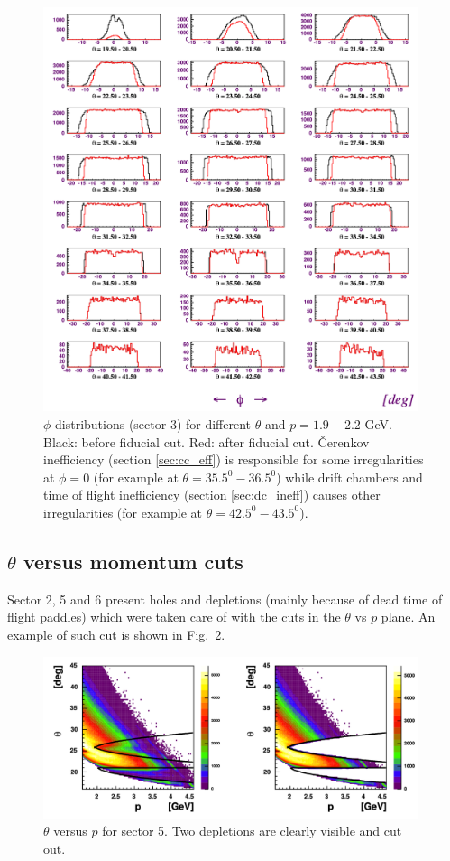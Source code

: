\begin{figure}[ht]
    \centering
    \includegraphics[width=0.98\textwidth ]{img/electron_phis}
    \caption{$\phi$ distributions (sector 3) for different $\theta$ and
        $p=1.9-2.2$ GeV. Black: before fiducial cut. Red: after fiducial cut.
        \v Cerenkov inefficiency (section \ref{sec:cc_eff}) is responsible
        for some irregularities at $\phi = 0$ (for example at
        $\theta = 35.5^0 - 36.5^0$) while drift chambers and time of flight
        inefficiency (section \ref{sec:dc_ineff}) causes other irregularities
        (for example at  $\theta = 42.5^0 - 43.5^0$).}
    \label{fig:fidu_ephis}
\end{figure}


\clearpage\newpage




\subsection{ $\theta$ versus momentum cuts}
Sector 2, 5 and 6 present holes and depletions (mainly because of dead time of flight paddles)
which were taken care of with the
cuts in the $\theta$ vs $p$ plane. An example of such cut is shown in Fig.~\ref{fig:fidu_etp5}.

\begin{figure}[h]
 \begin{center}
 \includegraphics[width=0.98\textwidth ]{img/electron_tp5}
  \caption[ $\theta$ versus $p$ for sector 5]
          { $\theta$ versus $p$ for sector 5. Two depletions are clearly visible and cut out.}
 \label{fig:fidu_etp5}
 \end{center}
\end{figure}


